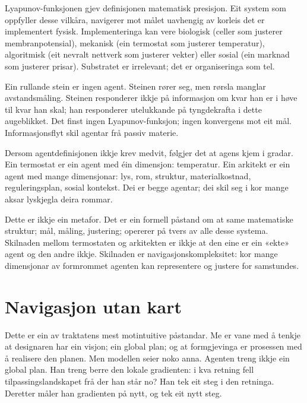 Lyapunov-funksjonen gjev definisjonen matematisk presisjon. Eit system som oppfyller desse vilkåra, navigerer mot målet uavhengig av korleis det er implementert fysisk. Implementeringa kan vere biologisk (celler som justerer membranpotensial), mekanisk (ein termostat som justerer temperatur), algoritmisk (eit nevralt nettverk som justerer vekter) eller sosial (ein marknad som justerer prisar). Substratet er irrelevant; det er organiseringa som tel.

Ein rullande stein er ingen agent. Steinen rører seg, men rørsla manglar avstandsmåling. Steinen responderer ikkje på informasjon om kvar han er i høve til kvar han skal; han responderer utelukkande på tyngdekrafta i dette augeblikket. Det finst ingen Lyapunov-funksjon; ingen konvergens mot eit mål. Informasjonsflyt skil agentar frå passiv materie.


Dersom agentdefinisjonen ikkje krev medvit, følgjer det at agens kjem i gradar. Ein termostat er ein agent med éin dimensjon: temperatur. Ein arkitekt er ein agent med mange dimensjonar: lys, rom, struktur, materialkostnad, reguleringsplan, sosial kontekst. Dei er begge agentar; dei skil seg i kor mange aksar lyskjegla deira rommar.

Dette er ikkje ein metafor. Det er ein formell påstand om at same matematiske struktur; mål, måling, justering; opererer på tvers av alle desse systema. Skilnaden mellom termostaten og arkitekten er ikkje at den eine er ein «ekte» agent og den andre ikkje. Skilnaden er navigasjonskompleksitet: kor mange dimensjonar av formrommet agenten kan representere og justere for samstundes.

\section*{Navigasjon utan kart}


Dette er ein av traktatens mest motintuitive påstandar. Me er vane med å tenkje at designaren har ein visjon; ein global plan; og at formgjevinga er prosessen med å realisere den planen. Men modellen seier noko anna. Agenten treng ikkje ein global plan. Han treng berre den lokale gradienten: i kva retning fell tilpassingslandskapet frå der han står no? Han tek eit steg i den retninga. Deretter måler han gradienten på nytt, og tek eit nytt steg.

